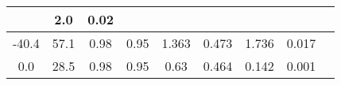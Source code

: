 \documentclass[a4paper,10pt]{article}
\begin{document}
\begin{longtable}{
     |
%    
    c|
%    
    c|
%    
    c|
%    
    c|
%    
    c|
%    
    c|
%    
    c|
%    
    c|
%    
    c|
%    
    }
%        
        & 2.0
%        

%        

%        
        & 0.02
%        

%        
        \\
        \hline

        

%        

%        
        -40.4
%        

%        

%        
        & 57.1
%        

%        

%        
        & 0.98
%        

%        

%        
        & 0.95
%        

%        

%        
        & 1.363
%        

%        

%        
        & 0.473
%        

%        

%        
        & 1.736
%        

%        

%        
        & 0.017
%        

%        
        \\
        \hline

        

%        

%        
        0.0
%        

%        

%        
        & 28.5
%        

%        

%        
        & 0.98
%        

%        

%        
        & 0.95
%        

%        

%        
        & 0.63
%        

%        

%        
        & 0.464
%        

%        

%        
        & 0.142
%        

%        

%        
        & 0.001
%        

%        
        \\
        \hline


\end{longtable}
\end{document}
